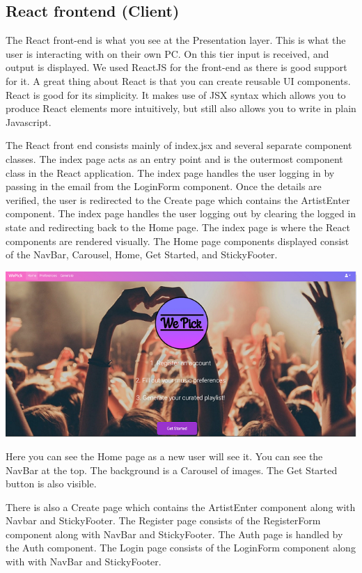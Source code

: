 \subsection{React frontend (Client)}
The React front-end is what you see at the Presentation layer. This is what the user is interacting with on their own PC. On this tier input is received, and output is displayed.
We used ReactJS for the front-end as there is good support for it. A great thing about React is that you can create reusable UI components. React is good for its simplicity. It makes use of JSX syntax which allows you to produce React elements more intuitively, but still also allows you to write in plain Javascript.\cite{ReactDocumentation}


The React front end consists mainly of index.jsx and several separate component classes. The index page acts as an entry point and is the outermost component class in the React application. The index page handles the user logging in by passing in the email from the LoginForm component. Once the details are verified, the user is redirected to the Create page which contains the ArtistEnter component. The index page handles the user logging out by clearing the logged in state and redirecting back to the Home page. 
The index page is where the React components are rendered visually. The Home page components displayed consist of the NavBar, Carousel, Home, Get Started, and StickyFooter. 

\begin{center}    
	\includegraphics{img/WePickHome.png}
\end{center}
Here you can see the Home page as a new user will see it. You can see the NavBar at the top.
The background is a Carousel of images. The Get Started button is also visible.\newline


There is also a Create page which contains the ArtistEnter component along with Navbar and StickyFooter.\newline
The Register page consists of the RegisterForm component along with NavBar and StickyFooter.\newline
The Auth page is handled by the Auth component.\newline
The Login page consists of the LoginForm component along with with NavBar and StickyFooter.\newline


